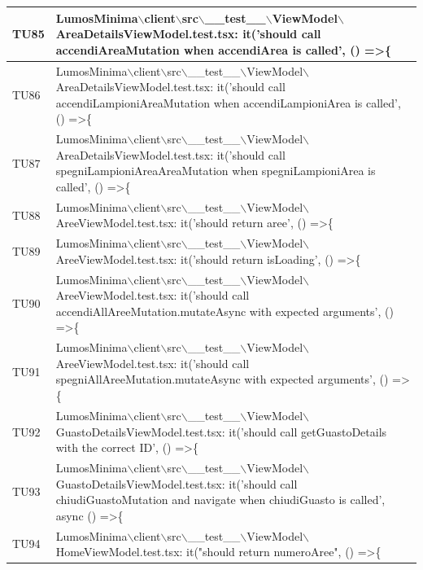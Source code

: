 \documentclass[12pt]{article}
\begin{document}
\begin{xltabular}{\linewidth}{|>{\hsize}X|X|}
	TU85 & LumosMinima$\backslash$client$\backslash$src$\backslash$\_\_test\_\_$\backslash$ViewModel$\backslash$AreaDetailsViewModel.test.tsx: it('should call accendiAreaMutation when accendiArea is called', () =\textgreater \{ \\ \hline
	TU86 & LumosMinima$\backslash$client$\backslash$src$\backslash$\_\_test\_\_$\backslash$ViewModel$\backslash$AreaDetailsViewModel.test.tsx: it('should call accendiLampioniAreaMutation when accendiLampioniArea is called', () =\textgreater \{ \\ \hline
	TU87 & LumosMinima$\backslash$client$\backslash$src$\backslash$\_\_test\_\_$\backslash$ViewModel$\backslash$AreaDetailsViewModel.test.tsx: it('should call spegniLampioniAreaAreaMutation when spegniLampioniArea is called', () =\textgreater \{ \\ \hline
	TU88 & LumosMinima$\backslash$client$\backslash$src$\backslash$\_\_test\_\_$\backslash$ViewModel$\backslash$AreeViewModel.test.tsx: it('should return aree', () =\textgreater \{ \\ \hline
	TU89 & LumosMinima$\backslash$client$\backslash$src$\backslash$\_\_test\_\_$\backslash$ViewModel$\backslash$AreeViewModel.test.tsx: it('should return isLoading', () =\textgreater \{ \\ \hline
	TU90 & LumosMinima$\backslash$client$\backslash$src$\backslash$\_\_test\_\_$\backslash$ViewModel$\backslash$AreeViewModel.test.tsx: it('should call accendiAllAreeMutation.mutateAsync with expected arguments', () =\textgreater \{ \\ \hline
	TU91 & LumosMinima$\backslash$client$\backslash$src$\backslash$\_\_test\_\_$\backslash$ViewModel$\backslash$AreeViewModel.test.tsx: it('should call spegniAllAreeMutation.mutateAsync with expected arguments', () =\textgreater \{ \\ \hline
	TU92 & LumosMinima$\backslash$client$\backslash$src$\backslash$\_\_test\_\_$\backslash$ViewModel$\backslash$GuastoDetailsViewModel.test.tsx: it('should call getGuastoDetails with the correct ID', () =\textgreater \{ \\ \hline
	TU93 & LumosMinima$\backslash$client$\backslash$src$\backslash$\_\_test\_\_$\backslash$ViewModel$\backslash$GuastoDetailsViewModel.test.tsx: it('should call chiudiGuastoMutation and navigate when chiudiGuasto is called', async () =\textgreater \{ \\ \hline
	TU94 & LumosMinima$\backslash$client$\backslash$src$\backslash$\_\_test\_\_$\backslash$ViewModel$\backslash$HomeViewModel.test.tsx: it("should return numeroAree", () =\textgreater \{ \\ \hline

\end{xltabular}
\end{document}
